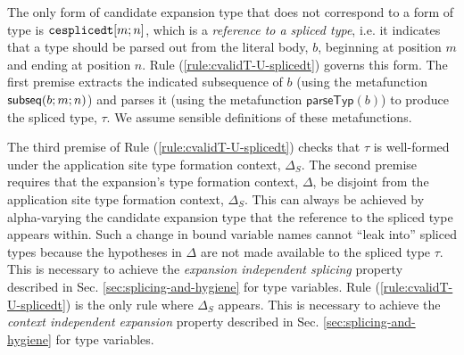 The only form of candidate expansion type that does not correspond to a form of type is $\texttt{cesplicedt}[m; n]$, which is a \emph{reference to a spliced type}, i.e. it indicates that a type should be parsed out from the literal body, $b$, beginning at position $m$ and ending at position $n$. Rule (\ref{rule:cvalidT-U-splicedt}) governs this form. The first premise extracts the indicated subsequence of $b$ (using the metafunction $\mathsf{subseq}(b; m; n)$) and parses it (using the metafunction $\mathsf{parseTyp}(b)$) to produce the spliced type, $\tau$. We assume sensible definitions of these metafunctions.

 The third premise of Rule (\ref{rule:cvalidT-U-splicedt}) checks that $\tau$ is well-formed under the application site type formation context, $\Delta_S$. The second premise requires that the expansion's type formation context, $\Delta$, be disjoint from the application site type formation context, $\Delta_S$. This can always be achieved by alpha-varying the candidate expansion type that the reference to the spliced type appears within. Such a change in bound variable names cannot ``leak into'' spliced types because the hypotheses in $\Delta$ are not made available to the spliced type $\tau$. This is necessary to achieve the \emph{expansion independent splicing} property described in Sec. \ref{sec:splicing-and-hygiene} for type variables. Rule (\ref{rule:cvalidT-U-splicedt}) is the only rule where $\Delta_S$ appears. This is necessary to achieve the \emph{context independent expansion} property described in Sec. \ref{sec:splicing-and-hygiene} for type variables.

